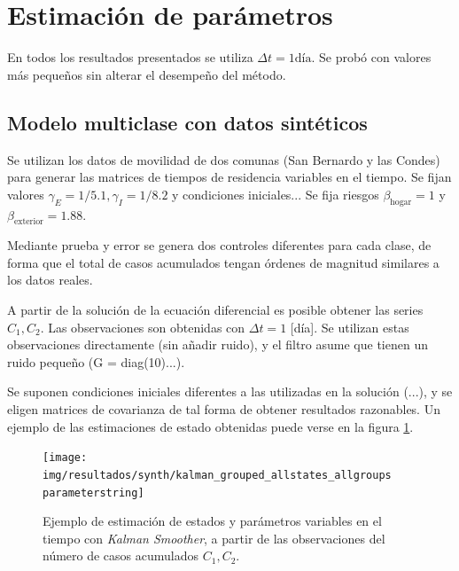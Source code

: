 \section{Estimación de parámetros}\label{sec:estimacion-results}

En todos los resultados presentados se utiliza \(\Delta t = 1 \text{día}\). Se probó con valores más pequeños sin alterar el desempeño del método.

\subsection{Modelo multiclase con datos sintéticos} \label{subsec:sintetico}

Se utilizan los datos de movilidad de dos comunas (San Bernardo y las Condes) para generar las matrices de tiempos de residencia variables en el tiempo. Se fijan valores \(\gamma_E = 1/5.1, \gamma_I = 1/8.2\) y condiciones iniciales... Se fija riesgos \(\beta_{\text{hogar}} = 1\) y \(\beta_{\text{exterior}} = 1.88\). 

Mediante prueba y error se genera dos controles diferentes para cada clase, de forma que el total de casos acumulados tengan órdenes de magnitud similares a los datos reales.

A partir de la solución de la ecuación diferencial es posible obtener las series \(C_1, C_2\). Las observaciones son obtenidas con \(\Delta t = 1\) [día]. Se utilizan estas observaciones directamente (sin añadir ruido), y el filtro asume que tienen un ruido pequeño (G = diag(10)...). 

Se suponen condiciones iniciales diferentes a las utilizadas en la solución (...), y se eligen matrices de covarianza de tal forma de obtener resultados razonables. Un ejemplo de las estimaciones de estado obtenidas puede verse en la figura \ref{synth-all-nohigh}.



\begin{figure}[!h]
\centering
\texttt{[image: img/resultados/synth/kalman\_grouped\_allstates\_allgroups\\parameterstring]}
\caption{Ejemplo de estimación de estados y parámetros variables en el tiempo con \textit{Kalman Smoother}, a partir de las observaciones del número de casos acumulados \(C_1, C_2\).}
\label{synth-all-nohigh}
\end{figure}

